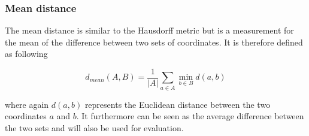 \subsubsection{Mean distance}
The mean distance is similar to the Hausdorff metric but is a measurement for the mean of the difference between two sets of coordinates.\newline
It is therefore defined as following

\begin{equation}
	d_{mean} (A,B) = \frac{1}{|A|} \sum_{a \in A} \min_{b \in B} d(a,b)
\end{equation}

where again $d(a,b)$ represents the Euclidean distance between the two coordinates $a$ and $b$. It furthermore can be seen as the average difference between the two sets and will also be used for evaluation.
